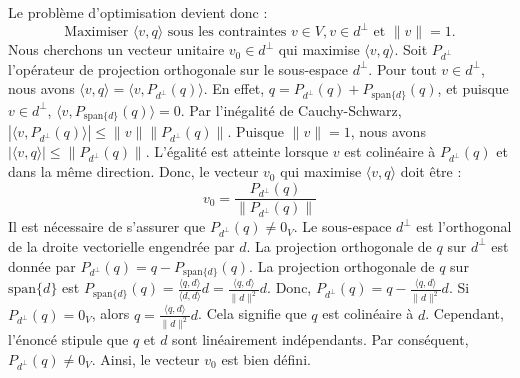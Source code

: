 \documentclass[11pt,a4paper]{report}
\begin{document}
\begin{enumerate}
\begin{enumerate}
    Le problème d'optimisation devient donc :
    \[ \text{Maximiser } \langle v, q \rangle \text{ sous les contraintes } v \in V, v \in d^\perp \text{ et } \|v\| = 1. \]
    Nous cherchons un vecteur unitaire \(v_0 \in d^\perp\) qui maximise
    \(\langle v, q \rangle\). Soit \(P_{d^\perp}\) l'opérateur de
    projection orthogonale sur le sous-espace \(d^\perp\). Pour tout
    \(v \in d^\perp\), nous avons
    \(\langle v, q \rangle = \langle v, P_{d^\perp}(q) \rangle\). En
    effet, \(q = P_{d^\perp}(q) + P_{\text{span}\{d\}}(q)\), et puisque
    \(v \in d^\perp\),
    \(\langle v, P_{\text{span}\{d\}}(q) \rangle = 0\). Par l'inégalité
    de Cauchy-Schwarz,
    \(|\langle v, P_{d^\perp}(q) \rangle| \le \|v\| \|P_{d^\perp}(q)\|\).
    Puisque \(\|v\|=1\), nous avons
    \(|\langle v, q \rangle| \le \|P_{d^\perp}(q)\|\). L'égalité est
    atteinte lorsque \(v\) est colinéaire à \(P_{d^\perp}(q)\) et dans
    la même direction. Donc, le vecteur \(v_0\) qui maximise
    \(\langle v, q \rangle\) doit être :
    \[ v_0 = \frac{P_{d^\perp}(q)}{\|P_{d^\perp}(q)\|} \] Il est
    nécessaire de s'assurer que \(P_{d^\perp}(q) \neq 0_V\). Le
    sous-espace \(d^\perp\) est l'orthogonal de la droite vectorielle
    engendrée par \(d\). La projection orthogonale de \(q\) sur
    \(d^\perp\) est donnée par
    \(P_{d^\perp}(q) = q - P_{\text{span}\{d\}}(q)\). La projection
    orthogonale de \(q\) sur \(\text{span}\{d\}\) est
    \(P_{\text{span}\{d\}}(q) = \frac{\langle q, d \rangle}{\langle d, d \rangle} d = \frac{\langle q, d \rangle}{\|d\|^2} d\).
    Donc,
    \(P_{d^\perp}(q) = q - \frac{\langle q, d \rangle}{\|d\|^2} d\). Si
    \(P_{d^\perp}(q) = 0_V\), alors
    \(q = \frac{\langle q, d \rangle}{\|d\|^2} d\). Cela signifie que
    \(q\) est colinéaire à \(d\). Cependant, l'énoncé stipule que \(q\)
    et \(d\) sont linéairement indépendants. Par conséquent,
    \(P_{d^\perp}(q) \neq 0_V\). Ainsi, le vecteur \(v_0\) est bien
    défini.


\end{enumerate}
\end{enumerate}
\end{document}
